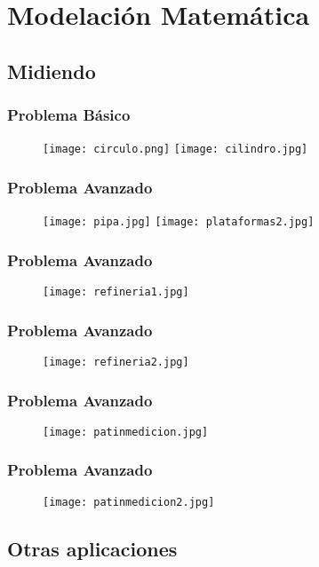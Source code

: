 \documentclass[xcolor=dvipsnames]{beamer}
\begin{document}
\section{Modelaci\'on Matem\'atica}
\subsection{Midiendo}
\begin{frame}\frametitle{Problema B\'asico}
\begin{figure}[H]
\centering
\texttt{[image: circulo.png]}\pause
\texttt{[image: cilindro.jpg]}
\end{figure}
\end{frame}

\begin{frame}\frametitle{Problema Avanzado}
\begin{figure}[H]
\centering
\texttt{[image: pipa.jpg]}\pause
\texttt{[image: plataformas2.jpg]}
\end{figure}
\end{frame}

\begin{frame}\frametitle{Problema Avanzado}
\begin{figure}[H]
\centering
\texttt{[image: refineria1.jpg]}
\end{figure}
\end{frame}


\begin{frame}\frametitle{Problema Avanzado}
\begin{figure}[H]
\centering
\texttt{[image: refineria2.jpg]}
\end{figure}
\end{frame}


\begin{frame}\frametitle{Problema Avanzado}
\begin{figure}[H]
\centering
\texttt{[image: patinmedicion.jpg]}
\end{figure}
\end{frame}


\begin{frame}\frametitle{Problema Avanzado}
\begin{figure}[H]
\centering
\texttt{[image: patinmedicion2.jpg]}
\end{figure}
\end{frame}
\subsection{Otras aplicaciones}
\end{document}
